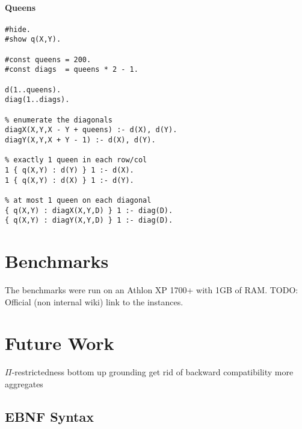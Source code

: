 \documentclass[a4paper,10pt]{article}
\begin{document}
\paragraph{Queens}
\begin{verbatim}
#hide.
#show q(X,Y).

#const queens = 200.
#const diags  = queens * 2 - 1.

d(1..queens).
diag(1..diags).

% enumerate the diagonals
diagX(X,Y,X - Y + queens) :- d(X), d(Y).
diagY(X,Y,X + Y - 1) :- d(X), d(Y).

% exactly 1 queen in each row/col
1 { q(X,Y) : d(Y) } 1 :- d(X).
1 { q(X,Y) : d(X) } 1 :- d(Y).

% at most 1 queen on each diagonal
{ q(X,Y) : diagX(X,Y,D) } 1 :- diag(D).
{ q(X,Y) : diagY(X,Y,D) } 1 :- diag(D).

\end{verbatim}

\section{Benchmarks}
The benchmarks were run on an Athlon XP 1700+ with 1GB of RAM.
TODO: Official (non internal wiki) link to the instances.


\section{Future Work}
$\Pi$-restrictedness
bottom up grounding
get rid of backward compatibility
more aggregates

\newpage
\textbf{\appendixname}
\begin{appendix}
\section{EBNF Syntax}
\label{appendix}

\end{appendix}



\appendix
\end{document}
